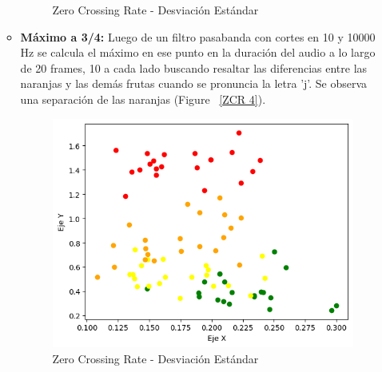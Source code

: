 \documentclass[a4paper, 12pt]{article}
\begin{document}
\begin{itemize}
\begin{itemize}
\begin{figure}[h]
                \caption{Zero Crossing Rate - Desviación Estándar}
                \label{ZCR 3}
            \end{figure}
        \item \textbf{Máximo a 3/4:} Luego de un filtro pasabanda con cortes en 10 y 10000 Hz se calcula el máximo en ese punto en la duración del audio a lo largo de 20 frames, 10 a cada lado buscando resaltar las diferencias entre las naranjas y las demás frutas cuando se pronuncia la letra 'j'. Se observa una separación de las naranjas (Figure ~\ref{ZCR 4}).
            \begin{figure}[h]
                \centering
                \includegraphics[width=0.4\linewidth]{ZCR3.png}
                \caption{Zero Crossing Rate - Desviación Estándar}
                \label{ZCR 3}
            \end{figure}
    \end{itemize}

    
\end{itemize}
\end{document}
